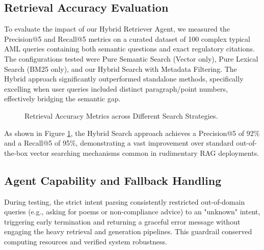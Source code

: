 ﻿\documentclass[conference]{IEEEtran}
\begin{document}
\subsection{Retrieval Accuracy Evaluation}
To evaluate the impact of our Hybrid Retriever Agent, we measured the Precision@5 and Recall@5 metrics on a curated dataset of 100 complex typical AML queries containing both semantic questions and exact regulatory citations. The configurations tested were Pure Semantic Search (Vector only), Pure Lexical Search (BM25 only), and our Hybrid Search with Metadata Filtering. The Hybrid approach significantly outperformed standalone methods, specifically excelling when user queries included distinct paragraph/point numbers, effectively bridging the semantic gap.

\begin{figure}[htbp]
\centering
{}
\caption{Retrieval Accuracy Metrics across Different Search Strategies.}
\label{fig:results}
\end{figure}

As shown in Figure \ref{fig:results}, the Hybrid Search approach achieves a Precision@5 of 92\% and a Recall@5 of 95\%, demonstrating a vast improvement over standard out-of-the-box vector searching mechanisms common in rudimentary RAG deployments.

\subsection{Agent Capability and Fallback Handling}
During testing, the strict intent parsing consistently restricted out-of-domain queries (e.g., asking for poems or non-compliance advice) to an "unknown" intent, triggering early termination and returning a graceful error message without engaging the heavy retrieval and generation pipelines. This guardrail conserved computing resources and verified system robustness.
\end{document}
